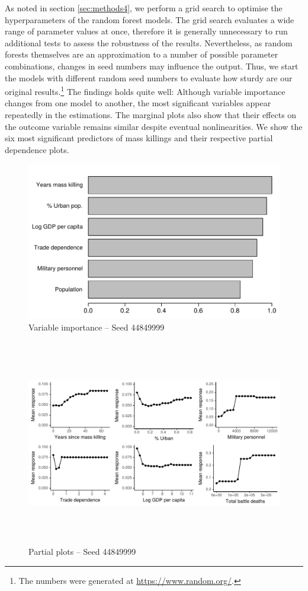 As noted in section \ref{sec:methods4}, we perform a grid search to optimise the hyperparameters of the random forest models. The grid search evaluates a wide range of parameter values at once, therefore it is generally unnecessary to run additional tests to assess the robustness of the results. Nevertheless, as random forests themselves are an approximation to a number of possible parameter combinations, changes in seed numbers may influence the output. Thus, we start the models with different random seed numbers to evaluate how sturdy are our original results.\footnote{The numbers were generated at \href{https://www.random.org/}{https://www.random.org/}.} The findings holds quite well: Although variable importance changes from one model to another, the most significant variables appear repeatedly in the estimations. The marginal plots also show that their effects on the outcome variable remains similar despite eventual nonlinearities. We show the six most significant predictors of mass killings and their respective partial dependence plots.

\begin{figure}[H]
    \centering
    \includegraphics{images/drf-mk2.pdf}
    \caption{Variable importance -- Seed 44849999}
    \label{fig:my_label}
\end{figure}

\begin{figure}[H]
    \centering
    \includegraphics[width=\textwidth, height=9cm]{images/drfdpp2.pdf}
    \caption{Partial plots -- Seed 44849999}
    \label{fig:my_label}
\end{figure}


